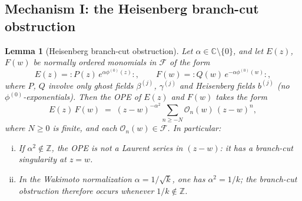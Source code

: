 \documentclass[12pt]{article}
\theoremstyle{plain}
\newtheorem{lemma}[theorem]{Lemma}
\theoremstyle{definition}
\theoremstyle{remark}
\newcommand{\C}{\mathbb{C}}
\newcommand{\bl}[1]{\beta^{(#1)}}
\newcommand{\gl}[1]{\gamma^{(#1)}}
\newcommand{\no}[1]{:\!#1\!:}
\begin{document}
\subsection{Mechanism I: the Heisenberg branch-cut obstruction}
\label{subsec:branch-cut}

\begin{lemma}[Heisenberg branch-cut obstruction]
\label{lem:heisenberg-branch}
  Let $\alpha\in\C\setminus\{0\}$, and let $E(z)$, $F(w)$ be normally ordered
  monomials in $\mathcal{F}$ of the form
  \[
    E(z)=\no{P(z)\,e^{\alpha\phi^{(0)}(z)}},\qquad
    F(w)=\no{Q(w)\,e^{-\alpha\phi^{(0)}(w)}},
  \]
  where $P$, $Q$ involve only ghost fields $\bl{j}$, $\gl{j}$ and Heisenberg
  fields $b^{(j)}$ (no $\phi^{(0)}$-exponentials).
  Then the OPE of $E(z)$ and $F(w)$ takes the form
  \begin{equation}\label{eq:branch-ope}
    E(z)\,F(w)
    \;=\;
    (z-w)^{-\alpha^{2}}
    \sum_{n\geq -N}
    \mathcal{O}_{n}(w)\,(z-w)^{n},
  \end{equation}
  where $N\geq 0$ is finite, and each $\mathcal{O}_n(w)\in\mathcal{F}$.
  In particular:
  \begin{enumerate}[(i)]
    \item If $\alpha^{2}\notin\mathbb{Z}$, the OPE is not a Laurent series in
      $(z-w)$: it has a branch-cut singularity at $z=w$.
    \item In the Wakimoto normalization $\alpha=1/\sqrt{k}$, one has
      $\alpha^2=1/k$; the branch-cut obstruction therefore occurs whenever
      $1/k\notin\mathbb{Z}$.
  \end{enumerate}
\end{lemma}
\end{document}
